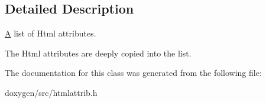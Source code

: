 \subsection{Detailed Description}
\mbox{\hyperlink{class_a}{A}} list of Html attributes. 

The Html attributes are deeply copied into the list. 

The documentation for this class was generated from the following file\+:\begin{DoxyCompactItemize}
\item 
doxygen/src/htmlattrib.\+h\end{DoxyCompactItemize}

